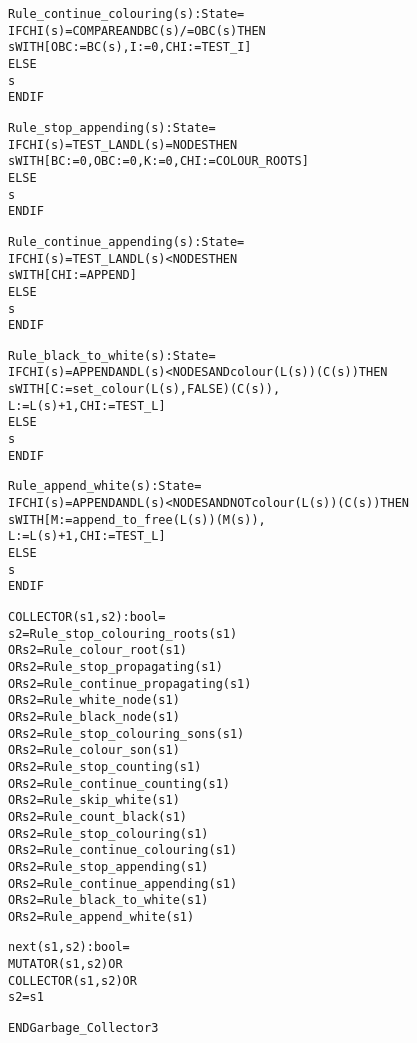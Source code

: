 \begin{alltt}
  Rule_continue_colouring(s):State =
    IF CHI(s) = COMPARE AND BC(s) /= OBC(s) THEN
      s WITH [OBC := BC(s), I := 0, CHI := TEST_I]
    ELSE 
      s
    ENDIF

  Rule_stop_appending(s):State =
    IF CHI(s) = TEST_L AND L(s) = NODES THEN
      s WITH [BC := 0, OBC := 0, K := 0, CHI := COLOUR_ROOTS]
    ELSE
      s
    ENDIF

  Rule_continue_appending(s):State =
    IF CHI(s) = TEST_L AND L(s) < NODES THEN
      s WITH [CHI := APPEND]
    ELSE 
      s 
    ENDIF

  Rule_black_to_white(s):State =
    IF CHI(s) = APPEND AND L(s) < NODES AND colour(L(s))(C(s)) THEN
      s WITH [C := set_colour(L(s),FALSE)(C(s)),
              L := L(s)+1, CHI := TEST_L]
    ELSE 
      s 
    ENDIF

  Rule_append_white(s):State =
    IF CHI(s) = APPEND AND L(s) < NODES AND NOT colour(L(s))(C(s)) THEN
      s WITH [M := append_to_free(L(s))(M(s)),
              L := L(s) + 1, CHI := TEST_L]
    ELSE 
      s 
    ENDIF

  COLLECTOR(s1,s2):bool =
     s2 = Rule_stop_colouring_roots(s1)
  OR s2 = Rule_colour_root(s1)
  OR s2 = Rule_stop_propagating(s1)
  OR s2 = Rule_continue_propagating(s1)
  OR s2 = Rule_white_node(s1)
  OR s2 = Rule_black_node(s1)
  OR s2 = Rule_stop_colouring_sons(s1)
  OR s2 = Rule_colour_son(s1)
  OR s2 = Rule_stop_counting(s1)
  OR s2 = Rule_continue_counting(s1)
  OR s2 = Rule_skip_white(s1)
  OR s2 = Rule_count_black(s1)
  OR s2 = Rule_stop_colouring(s1)
  OR s2 = Rule_continue_colouring(s1)
  OR s2 = Rule_stop_appending(s1)
  OR s2 = Rule_continue_appending(s1)
  OR s2 = Rule_black_to_white(s1)
  OR s2 = Rule_append_white(s1)


  %%%%%%%%%%%%%%%%%%%%%%%%%%%
  % The Transition Relation %
  %%%%%%%%%%%%%%%%%%%%%%%%%%%

  next(s1,s2):bool =
    MUTATOR(s1,s2) OR
    COLLECTOR(s1,s2) OR
    s2 = s1

END Garbage_Collector3
\end{alltt}


